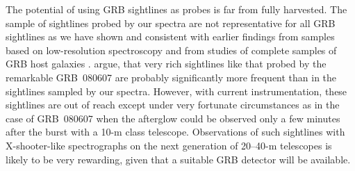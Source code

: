\documentclass[longauth]{aa}    %
\begin{document}
The potential of using GRB sightlines as probes is far from fully harvested. The
sample of sightlines probed by our spectra are not representative for all GRB
sightlines as we have shown and consistent with earlier findings from samples
based on low-resolution spectroscopy \citep[e.g.][]{Fynbo2009} and from studies
of complete samples of GRB host galaxies \citep{Hjorth2012, Covino2013,
	Perley2016a}. \cite{Kruhler2013} argue, that very rich sightlines like that
probed by the remarkable GRB~080607 \citep{Prochaska2009, Sheffer2009, Perley2011} are
probably significantly more frequent than in the sightlines sampled by our
spectra. However, with current instrumentation, these sightlines are out of
reach except under very fortunate circumstances as in the case of GRB~080607
when the afterglow could be observed only a few minutes after the burst with a
10-m class telescope. Observations of such sightlines with X-shooter-like
spectrographs on the next generation of 20--40-m telescopes is likely to be very
rewarding, given that a suitable GRB detector will be available.


\end{document}
